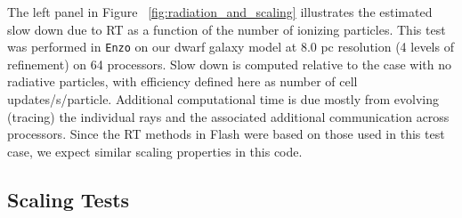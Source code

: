 \documentclass[11pt]{article}
\begin{document}

The left panel in Figure ~\ref{fig:radiation_and_scaling} illustrates the estimated slow down due to RT as a function of the number of ionizing particles. This test was performed in \texttt{Enzo} on our dwarf galaxy model at 8.0 pc resolution (4 levels of refinement) on 64 processors. Slow down is computed relative to the case with no radiative particles, with efficiency defined here as number of cell updates/s/particle. Additional computational time is due mostly from evolving (tracing) the individual rays and the associated additional communication across processors. Since the RT methods in Flash were based on those used in this test case, we expect similar scaling properties in this code.


\subsection{Scaling Tests}
\end{document}
